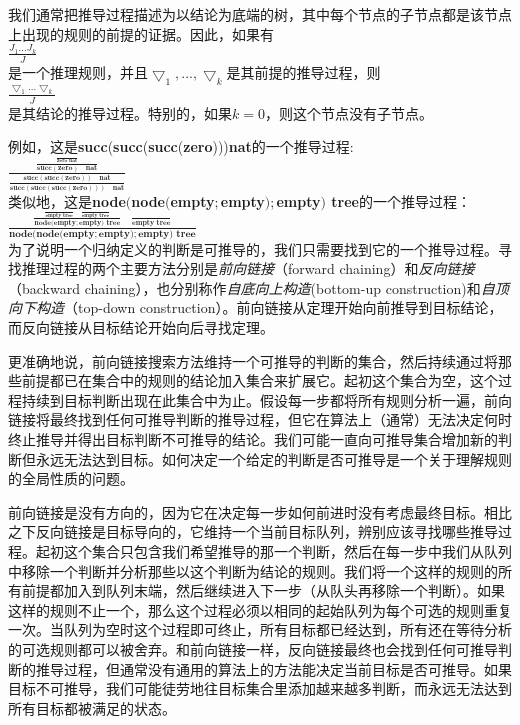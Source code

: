 我们通常把推导过程描述为以结论为底端的树，其中每个节点的子节点都是该节点上出现的规则的前提的证据。因此，如果有 \\
$\frac{J_{1} ... J_{k}}{J} $ \\
是一个推理规则，并且$\bigtriangledown_{1},...,\bigtriangledown_{k}$是其前提的推导过程，则 \\
$\frac{\bigtriangledown_{1} ... \bigtriangledown_{k}}{J} $ \\
是其结论的推导过程。特别的，如果$k=0$，则这个节点没有子节点。

例如，这是\textbf{succ}(\textbf{succ}(\textbf{succ}(\textbf{zero})))\quad\textbf{nat}的一个推导过程: \\
$\frac{\frac{\frac{}{\textbf{zero nat}}}{\textbf{succ}(\textbf{zero})\quad\textbf{nat}}}{\frac{\textbf{succ}(\textbf{succ}(\textbf{zero}))\quad\textbf{nat}}{\textbf{succ}(\textbf{succ}(\textbf{succ}(\textbf{zero})))\quad\textbf{nat}}} $\\
类似地，这是\textbf{node$($node$($empty$;$empty$);$empty$)$ tree}的一个推导过程：\\
$\frac{\frac{\frac{}{\textbf{empty tree}}\quad\frac{}{\textbf{empty tree}}}{\textbf{node$($empty$;$empty$)$ tree}}\quad\frac{}{\textbf{empty tree}}}{\textbf{node$($node$($empty$;$empty$);$empty$)$ tree}}$ \\
为了说明一个归纳定义的判断是可推导的，我们只需要找到它的一个推导过程。寻找推理过程的两个主要方法分别是\textit{前向链接}（forward chaining）和\textit{反向链接}（backward chaining），也分别称作\textit{自底向上构造}(bottom-up construction)和\textit{自顶向下构造}（top-down construction）。前向链接从定理开始向前推导到目标结论，而反向链接从目标结论开始向后寻找定理。

更准确地说，前向链接搜索方法维持一个可推导的判断的集合，然后持续通过将那些前提都已在集合中的规则的结论加入集合来扩展它。起初这个集合为空，这个过程持续到目标判断出现在此集合中为止。假设每一步都将所有规则分析一遍，前向链接将最终找到任何可推导判断的推导过程，但它在算法上（通常）无法决定何时终止推导并得出目标判断不可推导的结论。我们可能一直向可推导集合增加新的判断但永远无法达到目标。如何决定一个给定的判断是否可推导是一个关于理解规则的全局性质的问题。

前向链接是没有方向的，因为它在决定每一步如何前进时没有考虑最终目标。相比之下反向链接是目标导向的，它维持一个当前目标队列，辨别应该寻找哪些推导过程。起初这个集合只包含我们希望推导的那一个判断，然后在每一步中我们从队列中移除一个判断并分析那些以这个判断为结论的规则。我们将一个这样的规则的所有前提都加入到队列末端，然后继续进入下一步（从队头再移除一个判断）。如果这样的规则不止一个，那么这个过程必须以相同的起始队列为每个可选的规则重复一次。当队列为空时这个过程即可终止，所有目标都已经达到，所有还在等待分析的可选规则都可以被舍弃。和前向链接一样，反向链接最终也会找到任何可推导判断的推导过程，但通常没有通用的算法上的方法能决定当前目标是否可推导。如果目标不可推导，我们可能徒劳地往目标集合里添加越来越多判断，而永远无法达到所有目标都被满足的状态。
